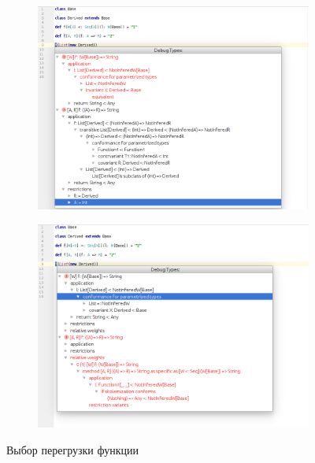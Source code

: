 \begin{figure}[h!]
  \centering
  \begin{subfigure}{\linewidth}
    \centering
    \includegraphics[width=.8\linewidth]{img/overloading1}
  \end{subfigure}

  \begin{subfigure}{\linewidth}
    \centering
    \includegraphics[width=.8\linewidth]{img/overloading2}
  \end{subfigure}
  \caption{Выбор перегрузки функции}
  \label{fig:overloading}
\end{figure}
